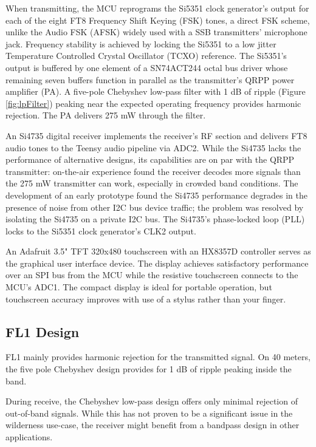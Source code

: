 \documentclass[10pt, letterpaper,]{article}
\begin{document}
When transmitting, the MCU reprograms the Si5351 clock generator's output for each of the eight FT8 Frequency Shift Keying (FSK) tones, a direct FSK scheme, unlike the Audio FSK (AFSK) widely used with a SSB transmitters' microphone jack.
Frequency stability is achieved by locking the Si5351 to a low jitter Temperature Controlled Crystal Oscillator (TCXO) reference.
The Si5351's output is buffered by one element of a SN74ACT244 octal bus driver whose remaining seven buffers function in parallel as the transmitter's QRPP power amplifier (PA).
A five-pole Chebyshev low-pass filter  with 1 dB of ripple (Figure \ref{fig:lpFilter}) peaking near the expected operating frequency  provides harmonic rejection.
The PA delivers 275 mW through the filter.

An Si4735 digital receiver implements the receiver's RF section and delivers FT8 audio tones to the Teensy audio pipeline via ADC2.
While the Si4735  lacks the performance of alternative designs, its capabilities are on par with the QRPP transmitter:  on-the-air experience found the receiver decodes more signals than the 275 mW transmitter can work, especially in crowded band conditions.
The development of an early prototype found the Si4735 performance degrades in the presence of noise from other I2C bus device traffic; the problem was resolved by isolating the Si4735 on a private I2C bus.
The Si4735's phase-locked loop (PLL) locks to the Si5351 clock generator's CLK2 output.

An Adafruit 3.5" TFT 320x480 touchscreen with an HX8357D controller serves as the graphical user interface device.
The display achieves satisfactory performance over an SPI bus from the MCU while the resistive touchscreen connects to the MCU's ADC1.
The compact display is ideal for portable operation,  but touchscreen accuracy improves with use of a stylus rather than your finger.








 
 \subsection*{FL1 Design}
FL1 mainly provides harmonic rejection for the transmitted signal.
On 40 meters, the five pole Chebyshev design provides for 1 dB of ripple peaking inside the band.

During receive, the Chebyshev low-pass design offers only minimal rejection of out-of-band signals. 
While this has not proven to be a significant issue in the wilderness use-case, the receiver might benefit from a bandpass design in other applications.
\end{document}
